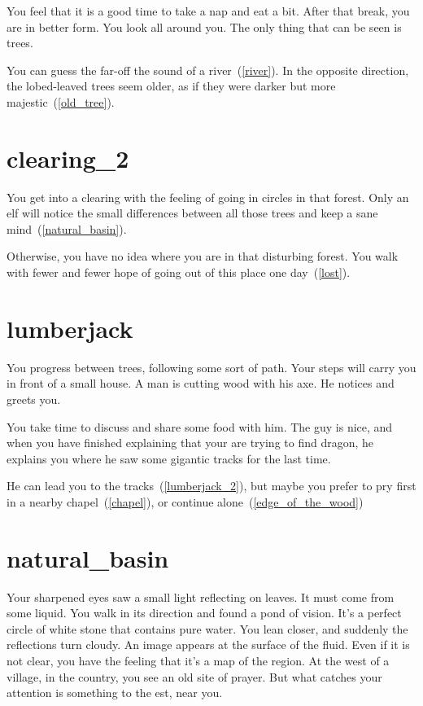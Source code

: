 You feel that it is a good time to take a nap and eat a bit. After that
break, you are in better form. You look all around you. The only thing that can
be seen is trees.

You can guess the far-off the sound of a river~(\ref{river}). In the opposite
direction, the lobed-leaved trees seem older, as if they were darker but more
majestic~(\ref{old_tree}).

\section{clearing_2}

You get into a clearing with the feeling of going in circles in that forest.
Only an elf will notice the small differences between all those trees and keep a
sane mind~(\ref{natural_basin}).

Otherwise, you have no idea where you are in that disturbing forest. You walk
with fewer and fewer hope of going out of this place one day~(\ref{lost}).

\section{lumberjack}

You progress between trees, following some sort of path. Your steps will carry
you in front of a small house. A man is cutting wood with his axe. He notices
and greets you.

You take time to discuss and share some food with him. The guy is nice, and when
you have finished explaining that your are trying to find dragon, he explains
you where he saw some gigantic tracks for the last time.

He can lead you to the tracks~(\ref{lumberjack_2}), but maybe you prefer to pry
first in a nearby chapel~(\ref{chapel}), or continue alone~(\ref{edge_of_the_wood})

\section{natural_basin}

Your sharpened eyes saw a small light reflecting on leaves. It must come from some
liquid. You walk in its direction and found a pond of vision. It's a perfect
circle of white stone that contains pure water. You lean closer, and suddenly the
reflections turn cloudy. An image appears at the surface of the fluid. Even if it
is not clear, you have the feeling that it's a map of the region. At the west of
a village, in the country, you see an old site of prayer. But what catches your
attention is something to the est, near you.

